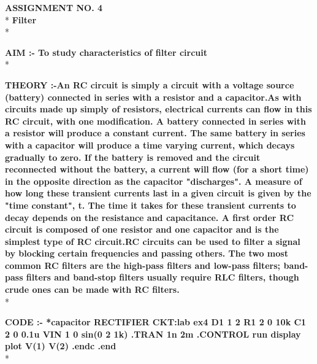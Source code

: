 \documentclass{article}
\begin{document}
\begin{center}
\Large{{\bf\color{rosewood}ASSIGNMENT NO. 4}}\\*
\vspace{2mm}
\large{{\bf\textcolor{rosewood}{ Filter}}}\\*
\vspace{5mm}
\end{center}
\begin{flushleft}
\large{{\bf\textcolor{rosewood}{AIM :-} To study characteristics of filter circuit}}\vspace{5mm}\\*

\large{{\bf\textcolor{rosewood}{THEORY} :-An RC circuit is simply a circuit with a voltage source (battery) connected in series with a resistor and a capacitor.As with circuits made up simply of resistors, electrical currents can flow in this RC circuit, with one 
modification. A battery connected in series with a resistor will produce a constant current. The same battery in series with a capacitor will produce a time varying current, which decays gradually to zero. If the battery is removed and the circuit reconnected without the battery, a current will flow (for a short time) in the opposite direction as the capacitor "discharges". A measure of how long these transient currents last in a given circuit is given by the "time constant", t.
The time it takes for these transient currents to decay depends on the resistance and capacitance.  A first order RC circuit is composed of one resistor and one capacitor and is the simplest type of RC circuit.RC circuits can be used to filter a signal by blocking certain frequencies and passing others. The two most common RC filters are the high-pass filters and low-pass filters; band-pass filters and band-stop filters usually require RLC filters, though crude ones can be made with RC filters.}}\vspace{5mm}\\*

\large{{\bf\textcolor{rosewood}{ CODE} :-
*capacitor RECTIFIER CKT:lab ex4\newline
D1 1 2 \newline
R1 2 0 10k\newline
C1 2 0 0.1u\newline
VIN 1 0 sin(0 2 1k)\newline
.TRAN 1n 2m\newline
.CONTROL\newline
run\newline
display\newline
plot V(1) V(2)\newline
.endc\newline
.end\newline}}\\*



\end{flushleft}
\end{document}

